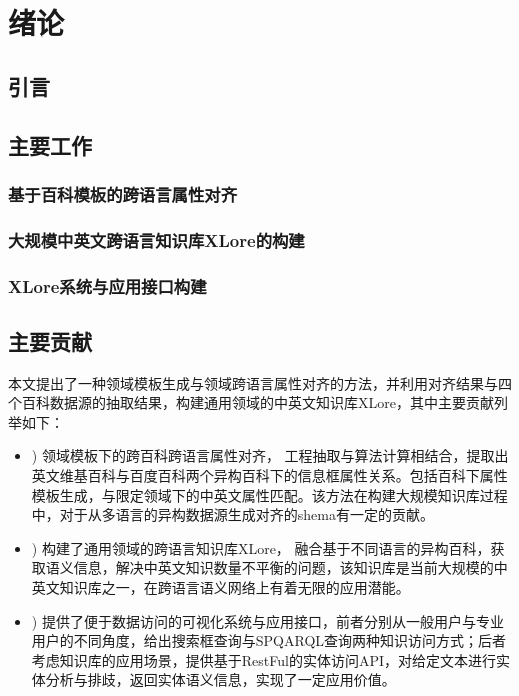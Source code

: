 \chapter{绪论}
\label{cha:intro}

\section{引言}

\section{主要工作}

\subsection{基于百科模板的跨语言属性对齐}
\subsection{大规模中英文跨语言知识库XLore的构建}
\subsection{XLore系统与应用接口构建}

\section{主要贡献}
本文提出了一种领域模板生成与领域跨语言属性对齐的方法，并利用对齐结果与四个百科数据源的抽取结果，构建通用领域的中英文知识库XLore，其中主要贡献列举如下：
\begin{itemize}
\item {) 领域模板下的跨百科跨语言属性对齐，} 工程抽取与算法计算相结合，提取出英文维基百科与百度百科两个异构百科下的信息框属性关系。包括百科下属性模板生成，与限定领域下的中英文属性匹配。该方法在构建大规模知识库过程中，对于从多语言的异构数据源生成对齐的shema有一定的贡献。
\item {) 构建了通用领域的跨语言知识库XLore，} 融合基于不同语言的异构百科，获取语义信息，解决中英文知识数量不平衡的问题，该知识库是当前大规模的中英文知识库之一，在跨语言语义网络上有着无限的应用潜能。
\item {) 提供了便于数据访问的可视化系统与应用接口，}前者分别从一般用户与专业用户的不同角度，给出搜索框查询与SPQARQL查询两种知识访问方式；后者考虑知识库的应用场景，提供基于RestFul的实体访问API，对给定文本进行实体分析与排歧，返回实体语义信息，实现了一定应用价值。
\end{itemize}

